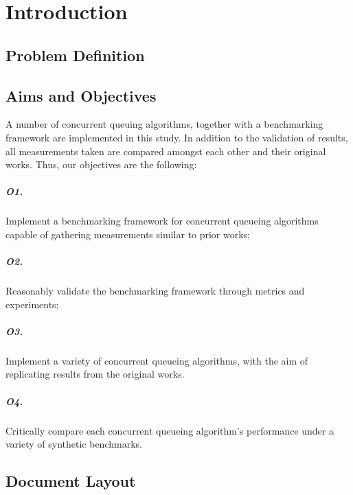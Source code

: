 \chapter{Introduction}
\section{Problem Definition}
\section{Aims and Objectives}

A number of concurrent queuing algorithms, together with a benchmarking
framework are implemented in this study. In addition to the validation of results, all
measurements taken are compared amongst each other and their original works.
Thus, our objectives are the following:

\paragraph{\textbf{O1.}} Implement a benchmarking framework for concurrent queueing
algorithms capable of gathering measurements similar to prior works;\label{ro:benchmarking_framework}

\paragraph{\textbf{O2.}} Reasonably validate the benchmarking framework through
metrics and experiments;\label{ro:validate_benchmarks}

\paragraph{\textbf{O3.}} Implement a variety of concurrent queueing algorithms, with the aim
of replicating results from the original works.\label{ro:implement_queues}

\paragraph{\textbf{O4.}} Critically compare each concurrent queueing algorithm's performance
under a variety of synthetic benchmarks.\label{ro:compare_results}
\section{Document Layout}
